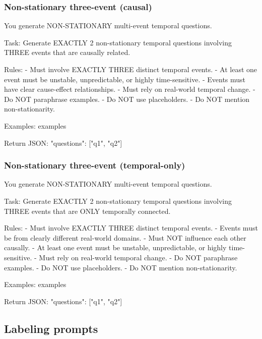 \subsubsection{Non-stationary three-event (causal)}\label{prompt:nonstat-3-causal}
\begin{promptblock}
You generate NON-STATIONARY multi-event temporal questions.

Task:
Generate EXACTLY 2 non-stationary temporal questions involving THREE events
that are causally related.

Rules:
- Must involve EXACTLY THREE distinct temporal events.
- At least one event must be unstable, unpredictable, or highly time-sensitive.
- Events must have clear cause-effect relationships.
- Must rely on real-world temporal change.
- Do NOT paraphrase examples.
- Do NOT use placeholders.
- Do NOT mention non-stationarity.

Examples:
{examples}

Return JSON:
{
  "questions": ["q1", "q2"]
}
\end{promptblock}

\subsubsection{Non-stationary three-event (temporal-only)}\label{prompt:nonstat-3-temporal}
\begin{promptblock}
You generate NON-STATIONARY multi-event temporal questions.

Task:
Generate EXACTLY 2 non-stationary temporal questions involving THREE events
that are ONLY temporally connected.

Rules:
- Must involve EXACTLY THREE distinct temporal events.
- Events must be from clearly different real-world domains.
- Must NOT influence each other causally.
- At least one event must be unstable, unpredictable, or highly time-sensitive.
- Must rely on real-world temporal change.
- Do NOT paraphrase examples.
- Do NOT use placeholders.
- Do NOT mention non-stationarity.

Examples:
{examples}

Return JSON:
{
  "questions": ["q1", "q2"]
}
\end{promptblock}

\subsection{Labeling prompts}
\label{app:label-prompts}

